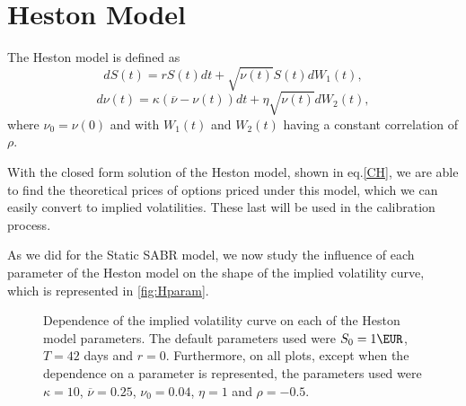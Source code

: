 \newpage
\section{Heston Model}
The Heston model is defined as
\begin{equation}
dS(t)=rS(t)dt+\sqrt{\nu(t)}S(t)dW_1(t),
\end{equation}
\begin{equation}
d\nu(t)=\kappa(\overline{\nu}-\nu(t))dt+\eta\sqrt{\nu(t)}dW_2(t),
\end{equation}
\noindent where $\nu_0=\nu(0)$ and with $W_1(t)$ and $W_2(t)$ having a constant correlation of $\rho$.

With the closed form solution of the Heston model, shown in eq.\eqref{CH}, we are able to find the theoretical prices of options priced under this model, which we can easily convert to implied volatilities. These last will be used in the calibration process.

As we did for the Static SABR model, we now study the influence of each parameter of the Heston model on the shape of the implied volatility curve, which is represented in \autoref{fig:Hparam}.

\begin{figure}[H]
  \begin{subfigmatrix}{2}
  \end{subfigmatrix}
  \caption[Dependence of the implied volatility curve on each of the Heston model parameters.]{Dependence of the implied volatility curve on each of the Heston model parameters. The default parameters used were $S_0=1\EUR$, $T=42$ days and $r=0$. Furthermore, on all plots, except when the dependence on a parameter is represented, the parameters used were $\kappa=10$, $\overline{\nu}=0.25$, $\nu_0=0.04$, $\eta=1$ and $\rho=-0.5$.}
  \label{fig:Hparam}
\end{figure}

